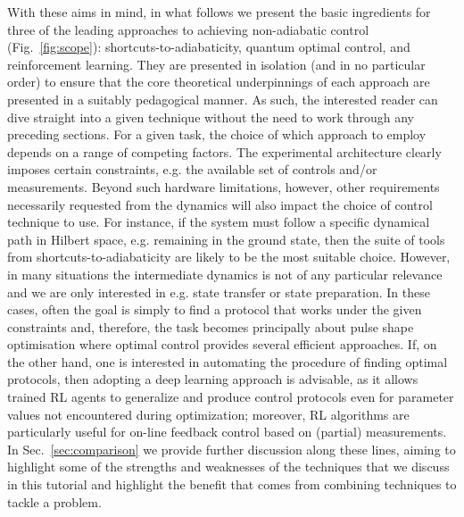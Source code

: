 With these aims in mind, in what follows we present the basic ingredients for three of the leading approaches to achieving non-adiabatic control (Fig.~\ref{fig:scope}): shortcuts-to-adiabaticity, quantum optimal control, and reinforcement learning. They are presented in isolation (and in no particular order) to ensure that the core theoretical underpinnings of each approach are presented in a suitably pedagogical manner. As such, the interested reader can dive straight into a given technique without the need to work through any preceding sections. For a given task, the choice of which approach to employ depends on a range of competing factors. The experimental architecture clearly imposes certain constraints, e.g. the available set of controls and/or measurements. Beyond such hardware limitations, however, other requirements necessarily requested from the dynamics will also impact the choice of control technique to use. For instance, if the system must follow a specific dynamical path in Hilbert space, e.g. remaining in the ground state, then the suite of tools from shortcuts-to-adiabaticity are likely to be the most suitable choice. However, in many situations the intermediate dynamics is not of any particular relevance and we are only interested in e.g. state transfer or state preparation. In these cases, often the goal is simply to find a protocol that works under the given constraints and, therefore, the task becomes principally about pulse shape optimisation where optimal control provides several efficient approaches. If, on the other hand, one is interested in automating the procedure of finding optimal protocols, then adopting a deep learning approach is advisable, as it allows trained RL agents to generalize and produce control protocols even for parameter values not encountered during optimization; moreover, RL algorithms are particularly useful for on-line feedback control based on (partial) measurements. In Sec.~\ref{sec:comparison} we provide further discussion along these lines, aiming to highlight some of the strengths and weaknesses of the techniques that we discuss in this tutorial and highlight the benefit that comes from combining techniques to tackle a problem.

